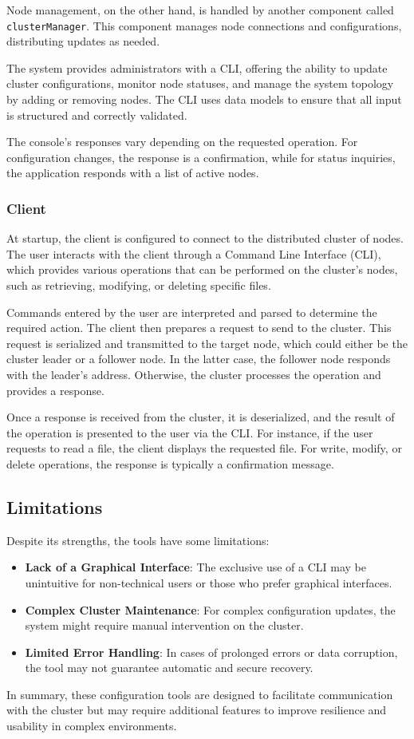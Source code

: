 Node management, on the other hand, is handled by another component called 
\texttt{clusterManager}. This component manages node connections and 
configurations, distributing updates as needed.

The system provides administrators with a CLI, offering the ability to update 
cluster configurations, monitor node statuses, and manage the system topology 
by adding or removing nodes. The CLI uses data models to ensure that all 
input is structured and correctly validated.

The console's responses vary depending on the requested operation. For 
configuration changes, the response is a confirmation, while for status 
inquiries, the application responds with a list of active nodes.
\subsubsection{Client}
At startup, the client is configured to connect to the distributed cluster
of nodes. The user interacts with the client through a Command Line Interface
(CLI), which provides various operations that can be performed on the 
cluster's nodes, such as retrieving, modifying, or deleting specific files. 

Commands entered by the user are interpreted and parsed to determine the 
required action. The client then prepares a request to send to the cluster. 
This request is serialized and transmitted to the target node, which could 
either be the cluster leader or a follower node. In the latter case, the 
follower node responds with the leader's address. Otherwise, the cluster 
processes the operation and provides a response.

Once a response is received from the cluster, it is deserialized, and the 
result of the operation is presented to the user via the CLI. For instance, 
if the user requests to read a file, the client displays the requested file. 
For write, modify, or delete operations, the response is typically a 
confirmation message.

\subsection{Limitations}
Despite its strengths, the tools have some limitations:

\begin{itemize}
  \item \textbf{Lack of a Graphical Interface}: The exclusive use of a CLI 
    may be unintuitive for non-technical users or those who prefer 
    graphical interfaces.
  \item \textbf{Complex Cluster Maintenance}: For complex configuration 
    updates, the system might require manual intervention on the cluster.
  \item \textbf{Limited Error Handling}: In cases of prolonged errors or 
    data corruption, the tool may not guarantee automatic and secure recovery.
\end{itemize}
In summary, these configuration tools are designed to facilitate communication 
with the cluster but may require additional features to improve resilience 
and usability in complex environments.

